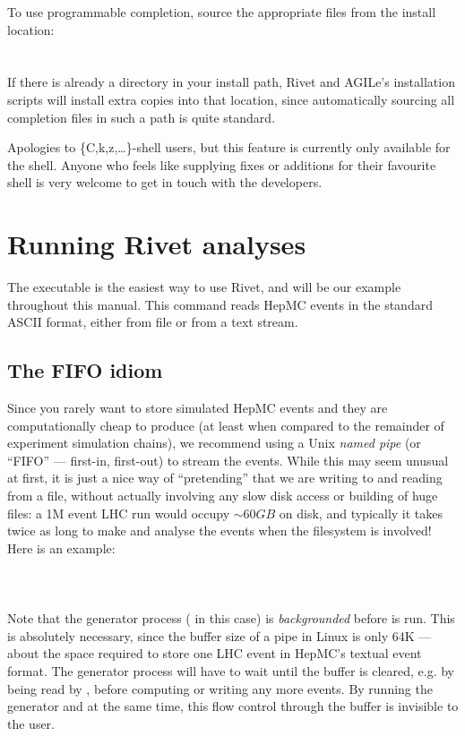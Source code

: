 \documentclass{JHEP3}
\begin{document}
To use programmable completion, source the appropriate files from the install
location:\\
\\
\\
If there is already a  directory in
your install path, Rivet and AGILe's installation scripts will install extra
copies into that location, since automatically sourcing all completion files in
such a path is quite standard.

Apologies to \{C,k,z,\dots\}-shell users, but this feature is currently only
available for the  shell. Anyone who feels like supplying fixes or
additions for their favourite shell is very welcome to get in touch with the
developers.



\section{Running Rivet analyses}
\label{sec:rivetgun}

The  executable is the easiest way to use Rivet, and will be our
example throughout this manual. This command reads HepMC events in the standard
ASCII format, either from file or from a text stream.

\subsection{The FIFO idiom}

Since you rarely want to store simulated HepMC events and they are
computationally cheap to produce (at least when compared to the remainder of
experiment simulation chains), we recommend using a Unix \emph{named pipe} (or
``FIFO'' --- first-in, first-out) to stream the events. While this may seem
unusual at first, it is just a nice way of ``pretending'' that we are writing to
and reading from a file, without actually involving any slow disk access or
building of huge files: a 1M event LHC run would occupy $\sim 60 GB$ on disk,
and typically it takes twice as long to make and analyse the events when the 
filesystem is involved! Here is an example:\\
\\
\\
\\
%
Note that the generator process ( in this case) is
\emph{backgrounded} before  is run. This is absolutely necessary,
since the buffer size of a pipe in Linux is only 64K --- about the space
required to store one LHC event in HepMC's textual event format. The generator
process will have to wait until the buffer is cleared, e.g. by being read by
, before computing or writing any more events. By running the
generator and  at the same time, this flow control through the buffer
is invisible to the user.
\end{document}
